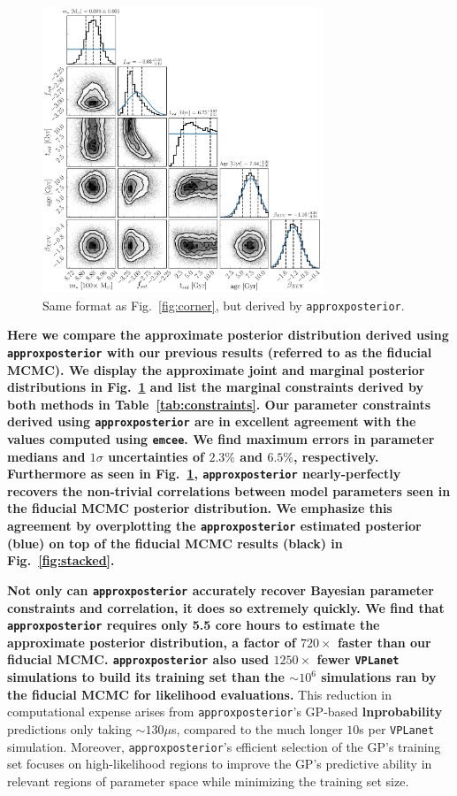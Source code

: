 \documentclass[twocolumn]{aastex62}
\newcommand{\xxx}[1]{{\textbf{#1}}}
\newcommand{\vplanet}[0]{\texttt{VPLanet}\xspace}
\newcommand{\emcee}[0]{\texttt{emcee}\xspace}
\newcommand{\approxposterior}[0]{\texttt{approxposterior}\xspace}
\begin{document}
\begin{figure}[t]
\centering
	\includegraphics[width=0.75\textwidth]{../Analysis/Approx/apCorner.pdf}
   \caption{Same format as Fig.~\ref{fig:corner}, but derived by \approxposterior.}%
    \label{fig:approx}%
\end{figure}

\xxx{Here we compare the approximate posterior distribution derived using \approxposterior with our previous results (referred to as the fiducial MCMC). We display the approximate joint and \xxx{marginal} posterior distributions in Fig.~\ref{fig:approx} and list the \xxx{marginal} constraints derived by both methods in Table~\ref{tab:constraints}. Our parameter constraints derived using \approxposterior are in excellent agreement with the values computed using \emcee. We find maximum errors in parameter medians and $1\sigma$ uncertainties of $2.3\%$ and $6.5\%$, respectively. Furthermore as seen in Fig.~\ref{fig:approx}, \approxposterior nearly-perfectly recovers the non-trivial correlations between model parameters seen in the fiducial MCMC posterior distribution. We emphasize this agreement by overplotting the \approxposterior estimated posterior (blue) on top of the fiducial MCMC results (black) in Fig.~\ref{fig:stacked}.}

\xxx{Not only can \approxposterior accurately recover Bayesian parameter constraints and correlation, it does so extremely quickly. We find that \approxposterior requires only 5.5 core hours to estimate the approximate posterior distribution, a factor of $720\times$ faster than our fiducial MCMC. \approxposterior also used $1250\times$ fewer \vplanet simulations to build its training set than the ${\sim}10^6$ simulations ran by the fiducial MCMC for likelihood evaluations.} This reduction in computational expense arises from \approxposterior's GP-based \xxx{lnprobability} predictions only taking ${\sim}130\mu$s, compared to the much longer $10$s per \vplanet simulation. Moreover, \approxposterior's efficient selection of the GP's training set focuses on high-likelihood regions to improve the GP's predictive ability in relevant regions of parameter space while minimizing the training set size. 
\end{document}
